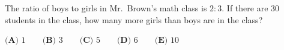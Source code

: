 The ratio of boys to girls in Mr.\ Brown's math class is $2:3$. If there are $30$ students in the class, how many more girls than boys are in the class?

$\textbf{(A) }1\qquad\textbf{(B) }3\qquad\textbf{(C) }5\qquad\textbf{(D) }6\qquad\textbf{(E) }10$
